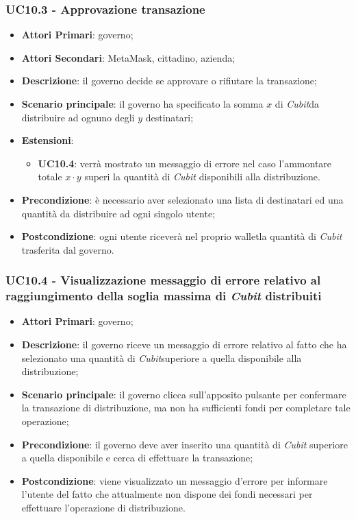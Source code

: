\subsubsection{UC10.3 - Approvazione transazione}
\begin{itemize}
	\item \textbf{Attori Primari}: governo;
	\item \textbf{Attori Secondari}: MetaMask\glo, cittadino, azienda\glo;
	\item \textbf{Descrizione}: il governo decide se approvare o rifiutare la transazione;
	\item \textbf{Scenario principale}: il governo ha specificato la somma 
	$x$ di \textit{Cubit}\glosp da distribuire ad ognuno degli $y$ destinatari;
	\item \textbf{Estensioni}:
	\begin{itemize}
		\item \textbf{UC10.4}: verrà mostrato un messaggio di errore nel caso 
		l'ammontare totale $x\cdot y$ superi la quantità di \textit{Cubit} disponibili 
		alla distribuzione.
	\end{itemize}
	\item \textbf{Precondizione}: è necessario aver selezionato una lista di destinatari ed una quantità da distribuire ad ogni singolo utente;
	\item \textbf{Postcondizione}: ogni utente riceverà nel proprio wallet\glosp la quantità di \textit{Cubit} trasferita dal governo.
\end{itemize}
\subsubsection{UC10.4 - Visualizzazione messaggio di errore relativo al raggiungimento della soglia massima di \textit{Cubit} distribuiti}
\begin{itemize}
	\item \textbf{Attori Primari}: governo;
	\item \textbf{Descrizione}: il governo riceve un messaggio di errore relativo al fatto che ha selezionato una quantità di \textit{Cubit}\glosp superiore a quella disponibile alla distribuzione;
	\item \textbf{Scenario principale}: il governo clicca sull'apposito pulsante per confermare la transazione di distribuzione, ma non ha sufficienti fondi per completare tale operazione;
	\item \textbf{Precondizione}: il governo deve aver inserito una quantità di \textit{Cubit} superiore a quella disponibile e cerca di effettuare la transazione;
	\item \textbf{Postcondizione}: viene visualizzato un messaggio d'errore per informare l'utente del fatto che attualmente non dispone dei fondi necessari per effettuare l'operazione di distribuzione.
	
\end{itemize} 
